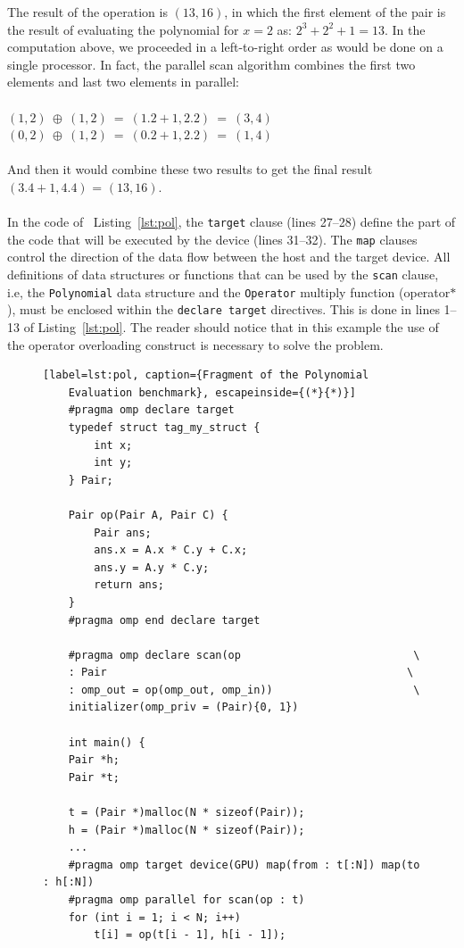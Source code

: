 \documentclass[Ingles]{ic-tese-v1}
\newcommand{\ttt}[1]{{\texttt{#1}}}
\newcommand{\rlst}[1]{Listing~\ref{lst:#1}}
\begin{document}
The result of the operation is $(13, 16)$, in which the first element of the pair  is the result  of
evaluating the polynomial for $x = 2$  as: $2^{3} + 2^{2} + 1 = 13$.
In the computation above, we proceeded in a left-to-right order as would be
done on a single processor. In fact, the parallel scan algorithm
combines the first two elements and last two elements in parallel:\\\\
$(1, 2) \:\oplus\: (1, 2) \:=\: (1 . 2 + 1, 2 . 2) \:=\: (3, 4)$\\
$(0, 2) \:\oplus\: (1, 2) \:=\: (0 . 2 + 1, 2 . 2) \:=\: (1, 4)$\\\\
And then it would combine these two results to get the final result $(3 . 4 + 1, 4 . 4)$
= $(13, 16)$.
\\\\
In the code of ~\rlst{pol}, the \ttt{target} clause (lines 27--28) define the part of the code
that will  be  executed by  the device  (lines 31--32).  The \ttt{map} clauses control the direction  of the data flow
between the host and the target device. All definitions of data structures
or functions  that can be used  by the \ttt{scan} clause,  i.e, the
\ttt{Polynomial} data  structure and the \ttt{Operator}  multiply function
(operator$*$),  must   be  enclosed  within  the   \ttt{declare  target}
directives. This is done in lines 1--13 of \rlst{pol}.
The reader should notice that in this example the use of the operator overloading
construct is necessary to solve the problem.

\begin{figure}[t]
	\lstset{basicstyle=\scriptsize}
	\begin{lstlisting}[label=lst:pol, caption={Fragment of the Polynomial
	Evaluation benchmark}, escapeinside={(*}{*)}]
	#pragma omp declare target
	typedef struct tag_my_struct {
		int x;
		int y;
	} Pair;

	Pair op(Pair A, Pair C) {
		Pair ans;
		ans.x = A.x * C.y + C.x;
		ans.y = A.y * C.y;
		return ans;
	}
	#pragma omp end declare target

	#pragma omp declare scan(op                           \
	: Pair                                               \
	: omp_out = op(omp_out, omp_in))                      \
	initializer(omp_priv = (Pair){0, 1})

	int main() {
	Pair *h;
	Pair *t;

	t = (Pair *)malloc(N * sizeof(Pair));
	h = (Pair *)malloc(N * sizeof(Pair));
	...
	#pragma omp target device(GPU) map(from : t[:N]) map(to : h[:N])
	#pragma omp parallel for scan(op : t)
	for (int i = 1; i < N; i++)
		t[i] = op(t[i - 1], h[i - 1]);

	\end{lstlisting}
\end{figure}
\end{document}
